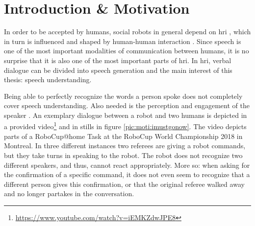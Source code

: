 
\chapter{Introduction \& Motivation}
\label{motiv:start}
In order to be accepted by humans, social robots in general depend on \gls{hri} \cite{6926324}, which in turn is influenced and shaped by human-human interaction \cite{mediaequation}.
Since speech is one of the most important modalities of communication between humans, it is no surprise that it is also one of the most important parts of \gls{hri}.
In \gls{hri}, verbal dialogue can be divided into speech generation and the main interest of this thesis: speech understanding.

Being able to perfectly recognize the words a person spoke does not completely cover speech understanding. Also needed is the perception and engagement of the speaker \cite{Ivaldi2017}.
An exemplary dialogue between a robot and two humans is depicted in a provided video\footnote{\url{https://www.youtube.com/watch?v=iEMKZdwJPE8}} and in stills in figure \ref{pic:moti:imustgonow}.
The video depicts parts of a RoboCup@home Task at the RoboCup World Championship 2018 in Montreal.
In three different instances two referees are giving a robot commands, but they take turns in speaking to the robot.
The robot does not recognize two different speakers, and thus, cannot react appropriately.
More so:
when asking for the confirmation of a specific command, it does not even seem to recognize that a different person gives this confirmation, or that the original referee walked away and no longer partakes in the conversation.

